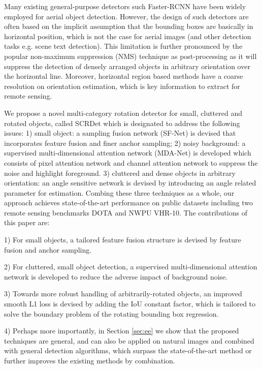 \documentclass[10pt,twocolumn,letterpaper]{article}
\begin{document}
	
	
	
	Many existing general-purpose detectors such Faster-RCNN \cite{ren2017faster} have been widely employed for aerial object detection. However, the design of such detectors are often based on the implicit assumption that the bounding boxes are basically in horizontal position, which is not the case for aerial images (and other detection tasks e.g. scene text detection). This limitation is further pronounced by the popular non-maximum suppression (NMS) technique as post-processing as it will suppress the detection of densely arranged objects in arbitrary orientation over the horizontal line. Moreover, horizontal region based methods have a coarse resolution on orientation estimation, which is key information to extract for remote sensing.
	


	We propose a novel multi-category rotation detector for small, cluttered and rotated objects, called SCRDet which is designated to address the following issues: 1) small object: a sampling fusion network (SF-Net) is devised that incorporates feature fusion and finer anchor sampling; 2) noisy background: a supervised multi-dimensional attention network (MDA-Net) is developed which consists of pixel attention network and channel attention network to suppress the noise and highlight foreground. 3) cluttered and dense objects in arbitrary orientation: an angle sensitive network is devised by introducing an angle related parameter for estimation. Combing these three techniques as a whole, our approach achieves state-of-the-art performance on public datasets including two remote sensing benchmarks DOTA and NWPU VHR-10. The contributions of this paper are:
	


	1) For small objects, a tailored feature fusion structure is devised by feature fusion and anchor sampling.
	
	2) For cluttered, small object detection, a supervised multi-dimensional attention network is developed to reduce the adverse impact of background noise.
	
	3) Towards more robust handling of arbitrarily-rotated objects, an improved smooth L1 loss is devised
	by adding the IoU constant factor, which is tailored to solve the boundary problem of the rotating bounding box regression.
	
	4) Perhaps more importantly, in Section \ref{sec:ee} we show that the proposed techniques are general, and can also be applied on natural images and combined with general detection algorithms, which surpass the state-of-the-art method or further improves the existing methods by combination.
	
\end{document}
